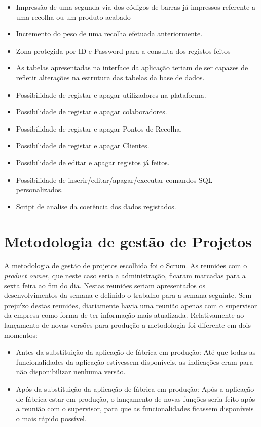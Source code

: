 \begin{itemize}
    \item Impressão de uma segunda via dos códigos de barras já impressos referente a uma recolha ou um produto acabado
    \item Incremento do peso de uma recolha efetuada anteriormente.
    \item Zona protegida por ID e Password para a consulta dos registos feitos
    \item As tabelas apresentadas na interface da aplicação teriam de ser capazes de refletir alterações na estrutura das tabelas da base de dados.
    \item Possibilidade de registar e apagar utilizadores na plataforma.
    \item Possibilidade de registar e apagar colaboradores.
    \item Possibilidade de registar e apagar Pontos de Recolha.
    \item Possibilidade de registar e apagar Clientes.
    \item Possibilidade de editar e apagar registos já feitos.
    \item Possibilidade de inserir/editar/apagar/executar comandos SQL personalizados.
    \item Script de analise da coerência dos dados registados.
\end{itemize}


\section{Metodologia de gestão de Projetos}
A metodologia de gestão de projetos escolhida foi o Scrum. As reuniões com o \textit{product owner}, que neste caso seria a administração, ficaram marcadas para a sexta feira ao fim do dia. Nestas reuniões seriam apresentados os desenvolvimentos da semana e definido o trabalho para a semana seguinte.
Sem prejuízo destas reuniões, diariamente havia uma reunião apenas com o supervisor da empresa como forma de ter informação mais atualizada.
Relativamente ao lançamento de novas versões para produção a metodologia foi diferente em dois momentos:
\begin{itemize}
    \item Antes da substituição da aplicação de fábrica em produção: Até que todas as funcionalidades da aplicação estivessem disponíveis, as indicações eram para não disponibilizar nenhuma versão.
    \item Após da substituição da aplicação de fábrica em produção: Após a aplicação de fábrica estar em produção, o lançamento de novas funções seria feito após a reunião com o supervisor, para que as funcionalidades ficassem disponíveis o mais rápido possível.
\end{itemize}

